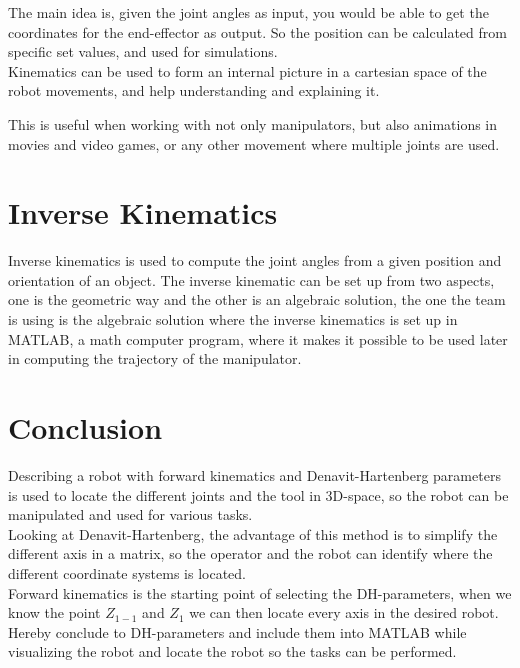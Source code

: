 The main idea is, given the joint angles as input, you would be able to get the coordinates for the end-effector as output. So the position can be calculated from specific set values, and used for simulations.\\

Kinematics can be used to form an internal picture in a cartesian space  of the robot movements, and help understanding and explaining it. 

This is useful when working with not only manipulators, but also animations in movies and video games, or any other movement where multiple joints are used. 



\section{Inverse Kinematics}
Inverse kinematics is used to compute the joint angles from a given position and orientation of an object\cite{JohnC}. The inverse kinematic can be set up from two aspects, one is the geometric way and the other is an algebraic solution, the one the team is using is the algebraic solution where the inverse kinematics is set up in MATLAB, a math computer program, where it makes it possible to be used later in computing the trajectory of the manipulator.\\




\section{Conclusion} 

Describing a robot with forward kinematics and Denavit-Hartenberg parameters is used to locate the different joints and the tool in 3D-space, so the robot can be manipulated and used for various tasks.\\
Looking at Denavit-Hartenberg, the advantage of this method is to simplify the different axis in a matrix, so the operator and the robot can identify where the different coordinate systems is located.\\
Forward kinematics is the starting point of selecting the DH-parameters, when we know the point $Z_{1-1}$ and $Z_1$ we can then locate every axis in the desired robot. Hereby conclude to DH-parameters and include them into MATLAB while visualizing the robot and locate the robot so the tasks can be performed.\\












